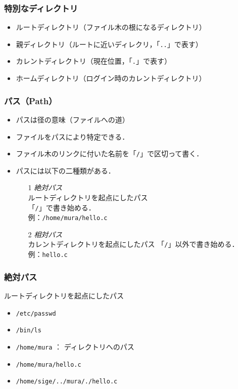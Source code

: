 \documentclass{beamer}                 %
\begin{document}
\begin{frame}[fragile]
  \frametitle{特別なディレクトリ}

  \begin{itemize}
  \item ルートディレクトリ（ファイル木の根になるディレクトリ）
  \item 親ディレクトリ（ルートに近いディレクリ，「\texttt{..}」で表す）
  \item カレントディレクトリ（現在位置，「\texttt{.}」で表す）
  \item ホームディレクトリ（ログイン時のカレントディレクトリ）
  \end{itemize}
\end{frame}

\begin{frame}[fragile]
  \frametitle{パス（Path）}
  \begin{itemize}
  \item パスは径の意味（ファイルへの道）
  \item ファイルをパスにより特定できる．
  \item ファイル木のリンクに付いた名前を「\texttt{/}」で区切って書く．
  \item パスには以下の二種類がある．
    \begin{enumerate}
    \item[1] \emph{絶対パス} \\
      ルートディレクトリを起点にしたパス\\
      「\texttt{/}」で書き始める．\\
      例：\texttt{/home/mura/hello.c}
    \item[2] \emph{相対パス} \\
      カレントディレクトリを起点にしたパス
      「\texttt{/}」以外で書き始める．\\
      例：\texttt{hello.c}
    \end{enumerate}
  \end{itemize}
\end{frame}

\begin{frame}[fragile]
  \frametitle{絶対パス}

  ルートディレクトリを起点にしたパス
  \begin{itemize}
  \item \texttt{/etc/passwd}
  \item \texttt{/bin/ls}
  \item \texttt{/home/mura} ： ディレクトリへのパス
  \item \texttt{/home/mura/hello.c}
  \item \texttt{/home/sige/../mura/./hello.c}
  \end{itemize}
\end{frame}
\end{document}
